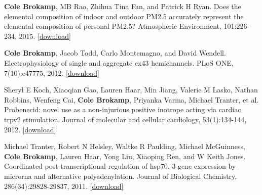 \textbf{Cole Brokamp}, MB Rao, Zhihua Tina Fan, and Patrick H Ryan. Does
the elemental composition of indoor and outdoor PM2.5 accurately
represent the elemental composition of personal PM2.5? Atmospheric
Environment, 101:226-234, 2015.
\href{https://github.com/cole-brokamp/cole-brokamp.github.io/raw/master/publications/1-s2.0-S1352231014008814-main.pdf}{{[}download{]}}

\textbf{Cole Brokamp}, Jacob Todd, Carlo Montemagno, and David Wendell.
Electrophysiology of single and aggregate cx43 hemichannels. PLoS ONE,
7(10):e47775, 2012.
\href{https://github.com/cole-brokamp/cole-brokamp.github.io/raw/master/publications/journal.pone.0047775.pdf}{{[}download{]}}

Sheryl E Koch, Xiaoqian Gao, Lauren Haar, Min Jiang, Valerie M Lasko,
Nathan Robbins, Wenfeng Cai, \textbf{Cole Brokamp}, Priyanka Varma,
Michael Tranter, et al. Probenecid: novel use as a non-injurious
positive inotrope acting via cardiac trpv2 stimulation. Journal of
molecular and cellular cardiology, 53(1):134-144, 2012.
\href{https://github.com/cole-brokamp/cole-brokamp.github.io/raw/master/publications/nihms-373871.pdf}{{[}download{]}}

Michael Tranter, Robert N Helsley, Waltke R Paulding, Michael
McGuinness, \textbf{Cole Brokamp}, Lauren Haar, Yong Liu, Xiaoping Ren,
and W Keith Jones. Coordinated post-transcriptional regulation of hsp70.
3 gene expression by microrna and alternative polyadenylation. Journal
of Biological Chemistry, 286(34):29828-29837, 2011.
\href{https://github.com/cole-brokamp/cole-brokamp.github.io/raw/master/publications/J.\%20Biol.\%20Chem.-2011-Tranter-29828-37.pdf}{{[}download{]}}

